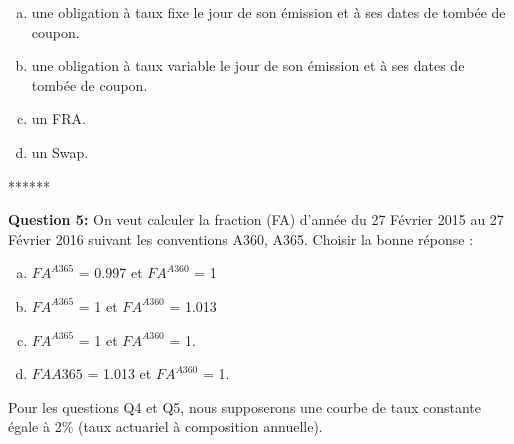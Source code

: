 \documentclass{article}
\newcommand{\indentitem}{\setlength\itemindent{25pt}}
\begin{document}
\begin{enumerate}[a)]
\indentitem \item une obligation à taux fixe le jour de son émission et à ses dates de tombée de coupon.
\indentitem \item une obligation à taux variable le jour de son émission et à ses dates de tombée de coupon.
\indentitem \item un FRA.
\indentitem \item un Swap.
\end{enumerate}
\smallskip
\centerline{******}
\smallskip
\textbf{Question 5:}
On veut calculer la fraction (FA) d’année du 27 Février 2015 au 27 Février 2016 suivant les conventions A360, A365. Choisir la bonne réponse :
\begin{enumerate}[a)]
\indentitem \item $FA^{A365}$ = 0.997 et $FA^{A360}$ = 1
\indentitem \item $FA^{A365}$ = 1 et $FA^{A360}$ = 1.013
\indentitem \item $FA^{A365}$ = 1 et $FA^{A360}$ = 1.
\indentitem \item $FAA365$ = 1.013 et $FA^{A360}$ = 1.
\end{enumerate}
Pour les questions Q4 et Q5, nous supposerons une courbe de taux constante égale à 2\% (taux actuariel à composition annuelle).\\
\end{document}
